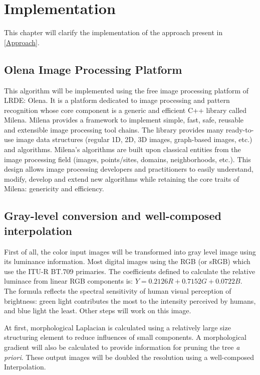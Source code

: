 
\graphicspath{ {5chapterImplementation/image/} }
\chapter{Implementation}

This chapter will clarify the implementation of the approach present in \ref{Approach}.
\section{Olena Image Processing Platform}
This algorithm will be implemented using the free image processing platform of LRDE: Olena. It is a platform dedicated to image processing and pattern recognition whose core component is a generic and efficient C++ library called Milena. Milena provides a framework to implement simple, fast, safe, reusable and extensible image processing tool chains. The library provides many ready-to-use image data structures (regular 1D, 2D, 3D images, graph-based images, etc.) and algorithms. Milena's algorithms are built upon classical entities from the image processing field (images, points/sites, domains, neighborhoods, etc.). This design allows image processing developers and practitioners to easily understand, modify, develop and extend new algorithms while retaining the core traits of Milena: genericity and efficiency.

\section{Gray-level conversion and well-composed interpolation}
First of all, the color input images will be transformed into gray level image using its luminance information. Most digital images using the RGB (or sRGB) which use the ITU-R BT.709 primaries. The coefficients defined to calculate the relative luminace from linear RGB components is: $Y = 0.2126R + 0.7152G + 0.0722B$. The formula reflects the spectral sensitivity of human visual perception of brightness: green light contributes the most to the intensity perceived by humans, and blue light the least. Other steps will work on this image. 
\par At first, morphological Laplacian is calculated using a relatively large size structuring element to reduce influences of small components. A morphological gradient will also be calculated to provide information for pruning the tree \textit{a priori}. These output images will be doubled the resolution using a well-composed Interpolation.

